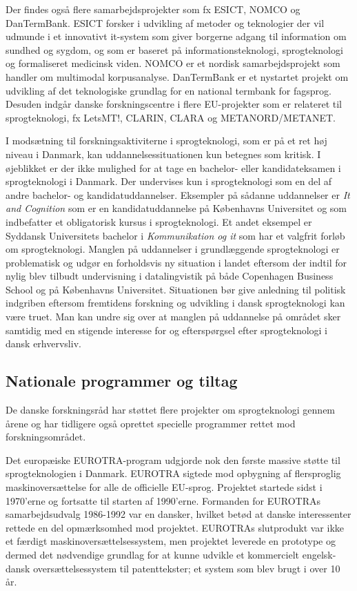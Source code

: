 \documentclass[]{../../metanetpaper}
\begin{document}
\begin{multicols}{2}
Der findes \mbox{ogs\aa} flere samarbejdsprojekter som fx ESICT, NOMCO og DanTermBank. ESICT forsker i udvikling af metoder og teknologier der vil udmunde i et innovativt it-system som giver borgerne adgang til information om sundhed og sygdom, og som er baseret \mbox{p\aa} informationsteknologi, sprogteknologi og formaliseret medicinsk viden. NOMCO er et nordisk samarbejdsprojekt som handler om multimodal korpusanalyse. DanTermBank er et nystartet projekt om udvikling af det teknologiske grundlag for en national termbank for fag\-sprog. Desuden indg\aa r danske forskningscentre i flere EU-projekter som er relateret til sprogteknologi, fx LetsMT!, CLARIN, CLARA og METANORD/METANET.

I mods\ae tning til forskningsaktiviterne i sprogteknologi, som er \mbox{p\aa} et ret h\o j niveau i Danmark, kan uddannelsessituationen kun betegnes som kritisk. I \o jeblikket er der ikke mulighed for at tage en bachelor- eller kandidateksamen i sprogteknologi i Danmark.  Der undervises kun i sprogteknologi som en del af andre bachelor- og kandidatuddannelser. Eksempler \mbox{p\aa} s\aa danne uddannelser er {\it It and Cognition} som er en kandidatuddannelse \mbox{p\aa} K\o benhavns Universitet og som indbefatter et obligatorisk kursus i sprogteknologi. Et andet eksempel er Syddansk Universitets bachelor i {\it Kommunikation og it} som har et valgfrit forl\o b om sprogteknologi. Manglen \mbox{p\aa} uddannelser i grundl\ae ggende sprogteknologi er problematisk og udg\o r en forholdsvis ny situation i landet eftersom der indtil for nylig blev tilbudt undervisning i datalingvistik \mbox{p\aa} b\aa de Copenhagen Business School og \mbox{p\aa} K\o benhavns Universitet. Situationen b\o r give anledning til politisk indgriben eftersom fremtidens forskning og udvikling i dansk sprogteknologi kan v\ae re truet. Man kan undre sig over at manglen \mbox{p\aa} uddannelse \mbox{p\aa} omr\aa det sker samtidig med en stigende interesse for og eftersp\o rgsel efter sprogteknologi i dansk erhvervsliv.

\subsection{Nationale programmer og tiltag}

De danske forskningsr\aa d har st\o ttet flere projekter om sprogteknologi gennem \aa rene og har tidligere \mbox{ogs\aa} oprettet specielle programmer rettet mod forskningsomr\aa det.

Det europ\ae iske EUROTRA-program udgjorde nok den f\o rste massive st\o tte til sprogteknologien i Danmark.  EUROTRA sigtede mod opbygning af flersproglig maskinovers\ae ttelse for alle de officielle EU-sprog. Projektet startede sidst i 1970'erne og fortsatte til starten af 1990'erne. Formanden for EUROTRAs samarbejdsudvalg 1986-1992 var en dansker, hvilket bet\o d at danske interessenter rettede en del opm\ae rksomhed mod projektet. EUROTRAs slutprodukt var ikke et f\ae rdigt maskinovers\ae ttelsessystem, men projektet leverede en prototype og dermed det n\o dvendige grundlag for at kunne udvikle et kommercielt engelsk-dansk overs\ae ttelsessystem til patenttekster; et system som blev brugt i over 10 \aa r.  


\end{multicols}
\end{document}
